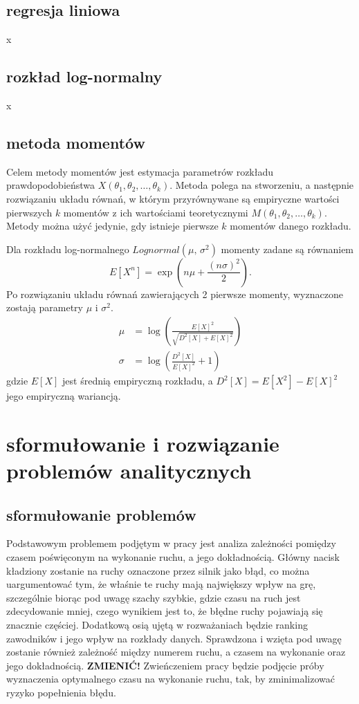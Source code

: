 \documentclass[inzynierska]{pwr_wmat_praca_dyplomowa}
\theoremstyle{plain}
\numberwithin{theorem}{chapter}
\theoremstyle{definition}
\numberwithin{theorem}{chapter}
\begin{document}
\section{regresja liniowa}
x
\section{rozkład log-normalny}
x
\section{metoda momentów}
Celem metody momentów \cite{momentowametoda} jest estymacja parametrów rozkładu prawdopodobieństwa $X(\theta_1, \theta_2, \dots, \theta_k)$. Metoda polega na stworzeniu, a następnie rozwiązaniu układu równań, w którym przyrównywane są empiryczne wartości pierwszych $k$ momentów z ich wartościami teoretycznymi $M(\theta_1, \theta_2, \dots, \theta_k)$. Metody można użyć jedynie, gdy istnieje pierwsze $k$ momentów danego rozkładu.

Dla rozkładu log-normalnego $Lognormal(\mu ,\,\sigma^{2})$ momenty zadane są równaniem\cite{lognorm}
\begin{equation*}
	E[X^n] = \exp (n\mu+\frac{(n\sigma)^2}{2}).
\end{equation*}
Po rozwiązaniu układu równań zawierających 2 pierwsze momenty, wyznaczone zostają parametry $\mu$ i $\sigma^2$. 
\begin{align*} 
	\mu &= \log\left(\frac{E[X]^2}{\sqrt{D^2[X]+E[X]^2}}\right) \\ 
	\sigma &=  \log\left(\frac{D^2[X]}{E[X]^2}+1\right)
\end{align*}
gdzie $E[X]$ jest średnią empiryczną rozkładu, a $D^2[X]=E[X^2]-E[X]^2$ jego empiryczną wariancją.

\chapter{sformułowanie i rozwiązanie problemów analitycznych}
\section{sformułowanie problemów}
Podstawowym problemem podjętym w pracy jest analiza zależności pomiędzy czasem poświęconym na wykonanie ruchu, a jego dokładnością. Główny nacisk kładziony zostanie na ruchy oznaczone przez silnik jako błąd, co można uargumentować tym, że właśnie te ruchy mają największy wpływ na grę, szczególnie biorąc pod uwagę szachy szybkie, gdzie czasu na ruch jest zdecydowanie mniej, czego wynikiem jest to, że błędne ruchy pojawiają się znacznie częściej. Dodatkową osią ujętą w rozważaniach będzie ranking zawodników i jego wpływ na rozkłady danych. Sprawdzona i wzięta pod uwagę zostanie również zależność między numerem ruchu, a czasem na wykonanie oraz jego dokładnością.
\textbf{ZMIENIĆ!} Zwieńczeniem pracy będzie podjęcie próby wyznaczenia optymalnego czasu na wykonanie ruchu, tak, by zminimalizować ryzyko popełnienia błędu.
\end{document}
